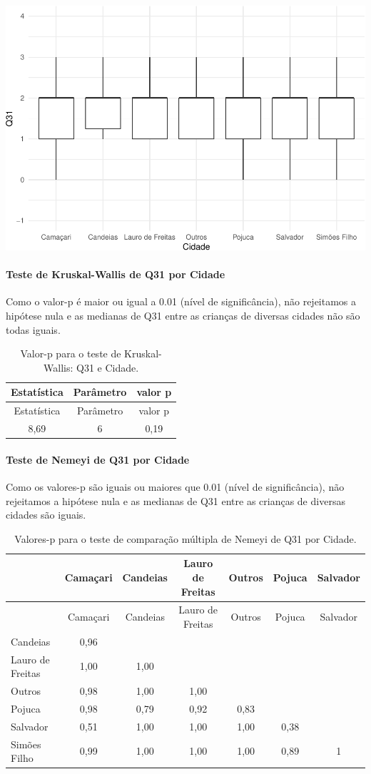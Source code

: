\documentclass[]{article}
\let\oldparagraph\paragraph
\renewcommand{\paragraph}[1]{\oldparagraph{#1}\mbox{}}
\begin{document}
\begin{center}\includegraphics[width=0.75\linewidth]{relatorio_covid19_files/figure-latex/unnamed-chunk-1020-1} \end{center}

\hypertarget{teste-de-kruskal-wallis-de-q31-por-cidade}{%
\paragraph{Teste de Kruskal-Wallis de Q31 por Cidade}\label{teste-de-kruskal-wallis-de-q31-por-cidade}}

Como o valor-p é maior ou igual a 0.01 (nível de significância), não rejeitamos a hipótese nula e as medianas de Q31 entre as crianças de diversas cidades não são todas iguais.

\begin{longtable}[]{@{}ccc@{}}
\caption{\label{tab:unnamed-chunk-1022}Valor-p para o teste de Kruskal-Wallis: Q31 e Cidade.}\tabularnewline
\toprule
Estatística & Parâmetro & valor p\tabularnewline
\midrule
\endfirsthead
\toprule
Estatística & Parâmetro & valor p\tabularnewline
\midrule
\endhead
8,69 & 6 & 0,19\tabularnewline
\bottomrule
\end{longtable}

\hypertarget{teste-de-nemeyi-de-q31-por-cidade}{%
\paragraph{Teste de Nemeyi de Q31 por Cidade}\label{teste-de-nemeyi-de-q31-por-cidade}}

Como os valores-p são iguais ou maiores que 0.01 (nível de significância), não rejeitamos a hipótese nula e as medianas de Q31 entre as crianças de diversas cidades são iguais.

\begin{longtable}[]{@{}lcccccc@{}}
\caption{\label{tab:unnamed-chunk-1024}Valores-p para o teste de comparação múltipla de Nemeyi de Q31 por Cidade.}\tabularnewline
\toprule
& Camaçari & Candeias & Lauro de Freitas & Outros & Pojuca & Salvador\tabularnewline
\midrule
\endfirsthead
\toprule
& Camaçari & Candeias & Lauro de Freitas & Outros & Pojuca & Salvador\tabularnewline
\midrule
\endhead
Candeias & 0,96 & & & & &\tabularnewline
Lauro de Freitas & 1,00 & 1,00 & & & &\tabularnewline
Outros & 0,98 & 1,00 & 1,00 & & &\tabularnewline
Pojuca & 0,98 & 0,79 & 0,92 & 0,83 & &\tabularnewline
Salvador & 0,51 & 1,00 & 1,00 & 1,00 & 0,38 &\tabularnewline
Simões Filho & 0,99 & 1,00 & 1,00 & 1,00 & 0,89 & 1\tabularnewline
\bottomrule
\end{longtable}
\end{document}
